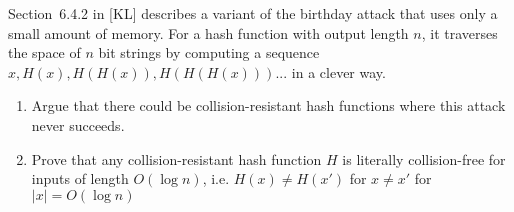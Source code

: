 \documentclass[a4paper,10pt,landscape,twocolumn]{scrartcl}
\begin{document}
\begin{bonusexercise}
Section~6.4.2 in [KL] describes a variant of the birthday attack that uses only a small amount of memory. For a hash function with output length $n$, it traverses the space of $n$ bit strings by computing a sequence $x, H(x), H(H(x)), H(H(H(x)))...$ in a clever way.
\begin{enumerate}
	\item Argue that there could be collision-resistant hash functions where this attack never succeeds.
	\item Prove that any collision-resistant hash function $H$ is literally collision-free for inputs of length $O(\log n)$, i.e. $H(x)\neq H(x')$ for $x\neq x'$ for $|x|=O(\log n)$
\end{enumerate}
\end{bonusexercise}
\end{document}

